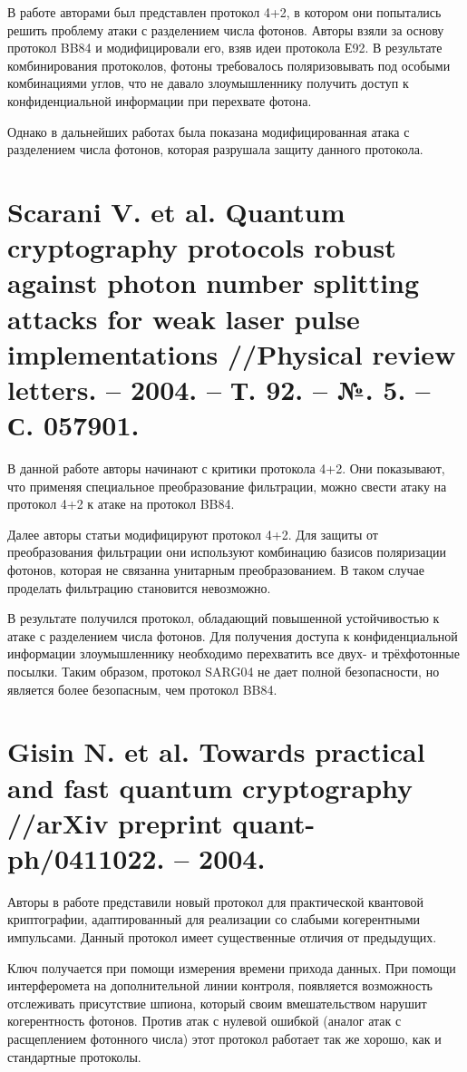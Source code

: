 В работе \cite{huttner1995quantum} авторами был представлен протокол 4+2, в котором они попытались решить проблему атаки с разделением числа фотонов. Авторы взяли за основу протокол BB84 и модифицировали его, взяв идеи протокола Е92. В результате комбинирования протоколов, фотоны требовалось поляризовывать под особыми комбинациями углов, что не давало злоумышленнику получить доступ к конфиденциальной информации при перехвате фотона.

Однако в дальнейших работах была показана модифицированная атака с разделением числа фотонов, которая разрушала защиту данного протокола.


\section{Scarani V. et al. Quantum cryptography protocols robust against photon number splitting attacks for weak laser pulse implementations //Physical review letters. – 2004. – Т. 92. – №. 5. – С. 057901.}

В данной работе \cite{scarani2004quantum} авторы начинают с критики протокола 4+2. Они показывают, что применяя специальное преобразование фильтрации, можно свести атаку на протокол 4+2 к атаке на протокол BB84.

Далее авторы статьи модифицируют протокол 4+2. Для защиты от преобразования фильтрации они используют комбинацию базисов поляризации фотонов, которая не связанна унитарным преобразованием. В таком случае проделать фильтрацию становится невозможно.

В результате получился протокол, обладающий повышенной устойчивостью к атаке с разделением числа фотонов. Для получения доступа к конфиденциальной информации злоумышленнику необходимо перехватить все двух- и трёхфотонные посылки. Таким образом, протокол SARG04 не дает полной безопасности, но является более безопасным, чем протокол BB84.



\section{Gisin N. et al. Towards practical and fast quantum cryptography //arXiv preprint quant-ph/0411022. – 2004.}
Авторы в работе \cite{gisin2004towards} представили новый протокол для практической квантовой криптографии, адаптированный для реализации со слабыми когерентными импульсами. Данный протокол имеет существенные отличия от предыдущих.

Ключ получается при помощи измерения времени прихода данных. При помощи интерферомета на дополнительной линии контроля, появляется возможность отслеживать присутствие шпиона, который своим вмешательством нарушит когерентность фотонов. Против атак с нулевой ошибкой (аналог атак с расщеплением фотонного числа) этот протокол работает так же хорошо, как и стандартные протоколы.


